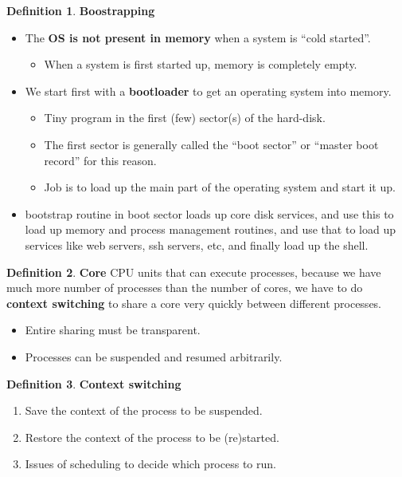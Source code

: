 \documentclass[11pt,a4paper]{article}
\theoremstyle{definition}
\newtheorem{definition}{Definition}[section]
\newenvironment{myitemize}
{ \begin{itemize}
    \setlength{\itemsep}{5pt}
    \setlength{\parskip}{0pt}
    \setlength{\parsep}{0pt}     }
{ \end{itemize}                  }
\newenvironment{myenumerate}
{ \begin{enumerate}
    \setlength{\itemsep}{5pt}
    \setlength{\parskip}{0pt}
    \setlength{\parsep}{0pt}     }
{ \end{enumerate}                }
\begin{document}
\begin{definition}{\textbf{Boostrapping}}
	\begin{myitemize}
	\item The \textbf{OS is not present in memory} when a system is “cold started”.
	\begin{myitemize}
		\item When a system is first started up, memory is completely empty.
	\end{myitemize}
	\item We start first with a \textbf{bootloader} to get an operating system into memory.
	\begin{myitemize}
	\item Tiny program in the first (few) sector(s) of the hard-disk.
	\item The first sector is generally called the “boot sector” or “master boot record” for this reason.
	\item Job is to load up the main part of the operating system and start it up.
	\end{myitemize}
	\item bootstrap routine in boot sector loads up core disk services, and use this to load up memory and process management routines, and use that to load up services like web servers, ssh servers, etc, and finally load up the shell.
\end{myitemize}
\end{definition}

\begin{definition}{\textbf{Core}}
	CPU units that can execute processes, because we have much more number of processes than the number of cores, we have to do \textbf{context switching} to share a core very quickly between different processes.
	\begin{myitemize}
		\item Entire sharing must be transparent.
		\item Processes can be suspended and resumed arbitrarily.
	\end{myitemize}
\end{definition}

\begin{definition}{\textbf{Context switching}}
	\begin{myenumerate}
		\item Save the \textsf{context} of the process to be suspended.
		\item Restore the \textsf{context} of the process to be (re)started.
		\item Issues of \textsf{scheduling} to decide which process to run.
	\end{myenumerate}
\end{definition}
\end{document}
